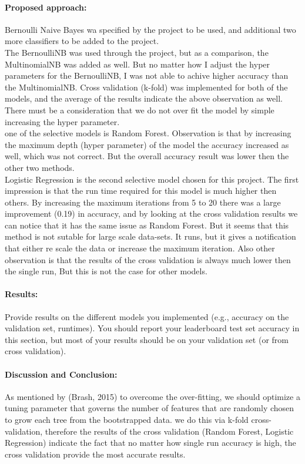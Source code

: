 \documentclass[12pt]{report}
\begin{document}
	\paragraph{Proposed approach:}
	Bernoulli Naive Bayes wa specified by the project to be used, and additional two more classifiers to be added to the project.\\
	The BernoulliNB was used through the project, but as a comparison, the MultinomialNB was added as well. But no matter how I adjust the hyper parameters for the BernoulliNB, I was not able to achive higher accuracy than the MultinomialNB. Cross validation (k-fold) was implemented for both of the models, and the average of the results indicate the above observation as well. There must be a consideration that we do not over fit the model by simple increasing the hyper parameter. \\
	one of the selective models is Random Forest. Observation is that by increasing the maximum depth (hyper parameter) of the model the accuracy increased as well, which was not correct. But the overall accuracy result was lower then the other two methods. \\
	Logistic Regression is the second selective model chosen for this project. The first impression is that the run time required for this model is much higher then others. By increasing the maximum iterations from 5 to 20 there was a large improvement (0.19) in accuracy, and by looking at the cross validation results we can notice that it has the same issue as Random Forest. But it seems that this method is not sutable for large scale data-sets. It runs, but it gives a notification that either re scale the data or increase the maximum iteration. Also other observation is that the results of the cross validation is always much lower then the single run, But this is not the case for other models. \\
	
	
	\paragraph{Results:}
	Provide results on the different
	models you implemented (e.g., accuracy on the validation set, runtimes). You should report your
	leaderboard test set accuracy in this section, but most of your results should be on your validation
	set (or from cross validation).
	

	\paragraph{Discussion and Conclusion:}
	As mentioned by (Brash, 2015) to overcome the over-fitting, we should optimize a tuning parameter that governs the number of features that are randomly chosen to grow each tree from the bootstrapped data. we do this via k-fold cross-validation, therefore the results of the cross validation (Random Forest, Logistic Regression) indicate the fact that no matter how single run accuracy is high, the cross validation provide the most accurate results.\\
	
\end{document}
